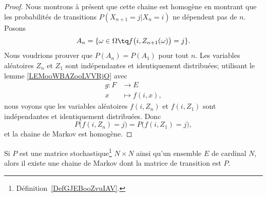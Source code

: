 \begin{proof}
	Nous montrons à présent que cette chaine est homogène en montrant que les probabilités de transitions \( P(X_{n+1}=j|X_n=i)\) ne dépendent pas de \( n\). Posons
	\begin{equation}
		A_n=\{ \omega\in \Omega\tq f\big( i,Z_{n+1}(\omega) \big)=j \}.
	\end{equation}
	Nous voudrions prouver que \( P(A_n)=P(A_{1})\) pour tout \( n\). Les variables aléatoires \( Z_n\) et \( Z_1\) sont indépendantes et identiquement distribuées; utilisant le lemme \ref{LEMooWBAZooLVVRjO} avec
	\begin{equation}
		\begin{aligned}
			g\colon F & \to E           \\
			x         & \mapsto f(i,x),
		\end{aligned}
	\end{equation}
	nous voyons que les variables aléatoires \( f(i,Z_n)\) et \( f(i, Z_1)\) sont indépendantes et identiquement distribuées. Donc
	\begin{equation}
		P\big( f(i,Z_n)=j \big)=P\big( f(i,Z_1)=j \big),
	\end{equation}
	et la chaine de Markov est homogène.
\end{proof}

\begin{lemma}       \label{LEMooQBOIooMNbJlV}
	Si \( P\) est une matrice stochastique\footnote{Définition~\ref{DefGJEBooZvuIAV}.} \( N\times N\) ainsi qu'un ensemble \( E\) de cardinal \( N\), alors il existe une chaine de Markov dont la matrice de transition est \( P\).
\end{lemma}

